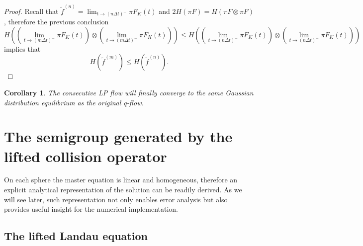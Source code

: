 \documentclass{article}
\newtheorem{coro}{Corollary}
\newtheorem{remark}{Remark}
\numberwithin{equation}{section}
\begin{document}
\begin{proof}
    Recall that $\widetilde{f}^{(n)} = \lim_{t\rightarrow (n\Delta t)^{-}}\pi F_{K}(t)$ and $2 H(\pi F) = H(\pi F \otimes \pi F)$, therefore the previous conclusion
    \begin{equation*}
        H\left(\left( \lim_{t\rightarrow (m\Delta t)^{-}}\pi F_{K}(t)\right) \otimes \left( \lim_{t\rightarrow (m\Delta t)^{-}}\pi F_{K}(t)\right)\right) \leq  H\left(\left( \lim_{t\rightarrow (n\Delta t)^{-}}\pi F_{K}(t)\right) \otimes \left( \lim_{t\rightarrow (n\Delta t)^{-}}\pi F_{K}(t)\right)\right)
    \end{equation*}
    implies that
    \begin{equation*}
        H(\widetilde{f}^{(m)}) \leq H(\widetilde{f}^{(n)}).
    \end{equation*}
    
    \end{proof}

\begin{coro}
    The consecutive LP flow will finally converge to the same Gaussian distribution equilibrium as the original q-flow.
\end{coro}





\section{The semigroup generated by the lifted collision operator}\label{sec:semigroup}
On each sphere the master equation is linear and homogeneous, therefore an explicit analytical representation of the solution can be readily derived. As we will see later, such representation not only enables error analysis but also provides useful insight for the numerical implementation.

\subsection{The lifted Landau equation}
\end{document}
